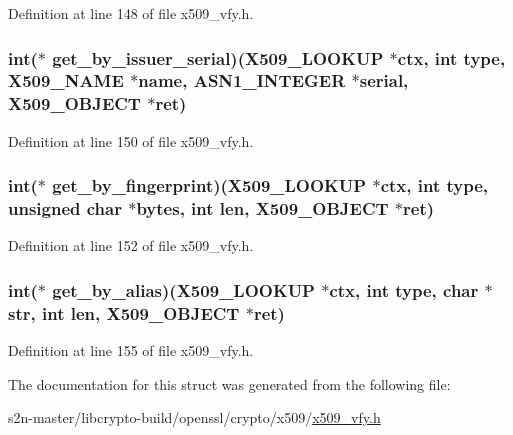 Definition at line 148 of file x509\+\_\+vfy.\+h.

\subsubsection[{\texorpdfstring{get\+\_\+by\+\_\+issuer\+\_\+serial}{get_by_issuer_serial}}]{\setlength{\rightskip}{0pt plus 5cm}int($\ast$ get\+\_\+by\+\_\+issuer\+\_\+serial)({\bf X509\+\_\+\+L\+O\+O\+K\+UP} $\ast$ctx, int {\bf type}, {\bf X509\+\_\+\+N\+A\+ME} $\ast${\bf name}, {\bf A\+S\+N1\+\_\+\+I\+N\+T\+E\+G\+ER} $\ast$serial, {\bf X509\+\_\+\+O\+B\+J\+E\+CT} $\ast$ret)}\hypertarget{structx509__lookup__method__st_adee08443a1c69ac9168ca7c2ea9f97a1}{}\label{structx509__lookup__method__st_adee08443a1c69ac9168ca7c2ea9f97a1}


Definition at line 150 of file x509\+\_\+vfy.\+h.

\subsubsection[{\texorpdfstring{get\+\_\+by\+\_\+fingerprint}{get_by_fingerprint}}]{\setlength{\rightskip}{0pt plus 5cm}int($\ast$ get\+\_\+by\+\_\+fingerprint)({\bf X509\+\_\+\+L\+O\+O\+K\+UP} $\ast$ctx, int {\bf type}, unsigned char $\ast${\bf bytes}, int {\bf len}, {\bf X509\+\_\+\+O\+B\+J\+E\+CT} $\ast$ret)}\hypertarget{structx509__lookup__method__st_a2ac209715dca1da0f48f10749eecdace}{}\label{structx509__lookup__method__st_a2ac209715dca1da0f48f10749eecdace}


Definition at line 152 of file x509\+\_\+vfy.\+h.

\subsubsection[{\texorpdfstring{get\+\_\+by\+\_\+alias}{get_by_alias}}]{\setlength{\rightskip}{0pt plus 5cm}int($\ast$ get\+\_\+by\+\_\+alias)({\bf X509\+\_\+\+L\+O\+O\+K\+UP} $\ast$ctx, int {\bf type}, char $\ast$str, int {\bf len}, {\bf X509\+\_\+\+O\+B\+J\+E\+CT} $\ast$ret)}\hypertarget{structx509__lookup__method__st_a69d303a2b6960d938c7bd2fee00191b1}{}\label{structx509__lookup__method__st_a69d303a2b6960d938c7bd2fee00191b1}


Definition at line 155 of file x509\+\_\+vfy.\+h.



The documentation for this struct was generated from the following file\+:\begin{DoxyCompactItemize}
\item 
s2n-\/master/libcrypto-\/build/openssl/crypto/x509/\hyperlink{crypto_2x509_2x509__vfy_8h}{x509\+\_\+vfy.\+h}\end{DoxyCompactItemize}
